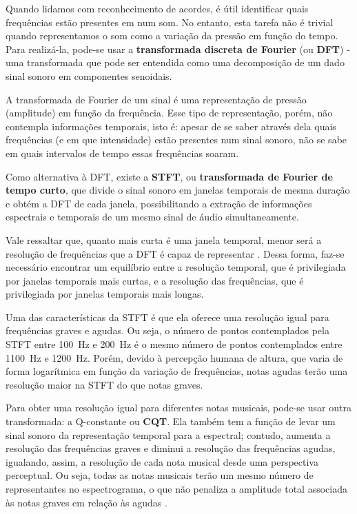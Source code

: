     Quando lidamos com reconhecimento de acordes, é útil identificar quais frequências estão presentes em num som. No entanto, esta tarefa não é trivial quando representamos o som como a variação da pressão em função do tempo. Para realizá-la, pode-se usar a \textbf{transformada discreta de Fourier} (ou \textbf{DFT}) - uma transformada que pode ser entendida como uma decomposição de um dado sinal sonoro em componentes senoidais.

    A transformada de Fourier de um sinal é uma representação de pressão (amplitude) em função da frequência. Esse tipo de representação, porém, não contempla informações temporais, isto é: apesar de se saber através dela quais frequências (e em que intensidade) estão presentes num sinal sonoro, não se sabe em quais intervalos de tempo essas frequências soaram.

    Como alternativa à DFT, existe a \textbf{STFT}, ou \textbf{transformada de Fourier de tempo curto}, que divide o sinal sonoro em janelas temporais de mesma duração e obtém a DFT de cada janela, possibilitando a extração de informações espectrais e temporais de um mesmo sinal de áudio simultaneamente.

    Vale ressaltar que, quanto mais curta é uma janela temporal, menor será a resolução de frequências que a DFT é capaz de representar  \citep[ver][seções 2.1 a 2.3]{dsp}. Dessa forma, faz-se necessário encontrar um equilíbrio entre a resolução temporal, que é privilegiada por janelas temporais mais curtas, e a resolução das frequências, que é privilegiada por janelas temporais mais longas.
    
    Uma das características da STFT é que ela oferece uma resolução igual para frequências graves e agudas. Ou seja, o número de pontos contemplados pela STFT entre 100~Hz e 200~Hz é o mesmo número de pontos contemplados entre 1100~Hz e 1200~Hz. Porém, devido à percepção humana de altura, que varia de forma logarítmica em função da variação de frequências, notas agudas terão uma resolução maior na STFT do que notas graves.
    
    Para obter uma resolução igual para diferentes notas musicais, pode-se usar outra transformada: a Q-constante ou \textbf{CQT}. Ela também tem a função de levar um sinal sonoro da representação temporal para a espectral; contudo, aumenta a resolução das frequências graves e diminui a resolução das frequências agudas, igualando, assim, a resolução de cada nota musical desde uma perspectiva perceptual. Ou seja, todas as notas musicais terão um mesmo número de representantes no espectrograma, o que não penaliza a amplitude total associada às notas graves em relação às agudas \citep[ver][seção 3.4.1]{muller}.


